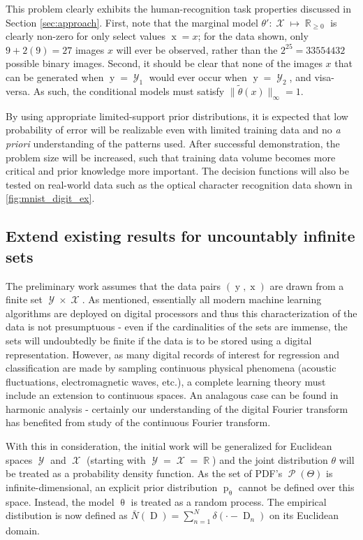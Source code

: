 \documentclass[12pt]{article}
\DeclareMathOperator{\xrm}{\mathrm{x}}
\DeclareMathOperator{\yrm}{\mathrm{y}}
\DeclareMathOperator{\Drm}{\mathrm{D}}
\DeclareMathOperator{\prm}{\mathrm{p}}
\DeclareMathOperator{\Xcal}{\mathcal{X}}
\DeclareMathOperator{\Ycal}{\mathcal{Y}}
\DeclareMathOperator{\Pcal}{\mathcal{P}}
\DeclareMathOperator{\Rbb}{\mathbb{R}}
\begin{document}
This problem clearly exhibits the human-recognition task properties discussed in Section \ref{sec:approach}. First, note that the marginal model $\theta': \Xcal \mapsto \Rbb_{\geq 0}$ is clearly non-zero for only select values $\xrm = x$; for the data shown, only $9+2(9) = 27$ images $x$ will ever be observed, rather than the $2^{25} = 33554432$ possible binary images. Second, it should be clear that none of the images $x$ that can be generated when $\yrm = \Ycal_1$ would ever occur when $\yrm = \Ycal_2$, and visa-versa. As such, the conditional models must satisfy $\big\| \tilde{\theta}(x) \big\|_{\infty} = 1$.

By using appropriate limited-support prior distributions, it is expected that low probability of error will be realizable even with limited training data and no \emph{a priori} understanding of the patterns used. After successful demonstration, the problem size will be increased, such that training data volume becomes more critical and prior knowledge more important. The decision functions will also be tested on real-world data such as the optical character recognition data shown in \ref{fig:mnist_digit_ex}.
 




\subsection{Extend existing results for uncountably infinite sets}

The preliminary work assumes that the data pairs $(\yrm,\xrm)$ are drawn from a finite set $\Ycal \times \Xcal$. As mentioned, essentially all modern machine learning algorithms are deployed on digital processors and thus this characterization of the data is not presumptuous - even if the cardinalities of the sets are immense, the sets will undoubtedly be finite if the data is to be stored using a digital representation. However, as many digital records of interest for regression and classification are made by sampling continuous physical phenomena (acoustic fluctuations, electromagnetic waves, etc.), a complete learning theory must include an extension to continuous spaces. An analagous case can be found in harmonic analysis - certainly our understanding of the digital Fourier transform has benefited from study of the continuous Fourier transform.

With this in consideration, the initial work will be generalized for Euclidean spaces $\Ycal$ and $\Xcal$ (starting with $\Ycal = \Xcal = \Rbb$) and the joint distribution $\theta$ will be treated as a probability density function. As the set of PDF's $\Pcal(\Theta)$ is infinite-dimensional, an explicit prior distribution $\prm_{\uptheta}$ cannot be defined over this space. Instead, the model $\uptheta$ is treated as a random process. The empirical distibution is now defined as $\bar{N}(\Drm) = \sum_{n=1}^N \delta\left( \cdot - \Drm_n \right)$ on its Euclidean domain.
\end{document}
